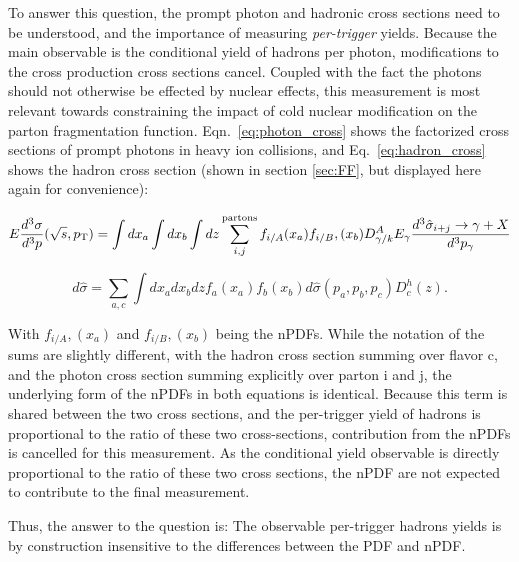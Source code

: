 To answer this question, the prompt photon and hadronic cross sections need to be understood, and the importance of measuring  \textit{per-trigger} yields. Because the main observable is the conditional yield of hadrons per photon, modifications to the cross production cross sections cancel. Coupled with the fact the photons should not otherwise be effected by nuclear effects, this measurement is most relevant towards constraining the impact of cold nuclear modification on the parton fragmentation function. Eqn.~\ref{eq:photon_cross} shows the factorized cross sections of prompt photons in heavy ion collisions, and Eq.~\ref{eq:hadron_cross} shows the hadron cross section (shown in section \ref{sec:FF}, but displayed here again for convenience):

  \begin{equation}
    E\frac{d^3\sigma}{d^3p}(\sqrt{s},p_{\mathrm{T}}) = \int dx_a \int dx_b \int dz \sum^\mathrm{partons}_{i,j}f_{i/A}(x_a)f_{i/B},(x_b) D_{\gamma/k}^{A}E_{\gamma}\frac{d^3\hat{\sigma}_{i+j}\rightarrow\gamma+X}{d^3p_{\gamma}}
    \label{eq:photon_cross}
  \end{equation}

  \begin{equation}
    d\hat{\sigma}= \sum_{a,c} \int dx_a dx_b dz f_a(x_a) f_b(x_b) d\hat{\sigma}(p_a,p_b,p_c) D_c^h(z).
    \label{eq:hadron_cross}
  \end{equation}

With $f_{i/A},(x_a)$ and  $f_{i/B},(x_b)$ being the nPDFs. While the notation of the sums are slightly different, with the hadron cross section summing over flavor c, and the photon cross section summing explicitly over parton i and j, the underlying form of the nPDFs in both equations is identical. Because this term is shared between the two cross sections, and the per-trigger yield of hadrons is proportional to the ratio of these two cross-sections, contribution from the nPDFs is cancelled for this measurement. As the conditional yield observable is directly proportional to the ratio of these two cross sections, the nPDF are not expected to contribute to the final measurement.

Thus, the answer to the question is: The observable per-trigger hadrons yields is by construction insensitive to the differences between the PDF and nPDF.

